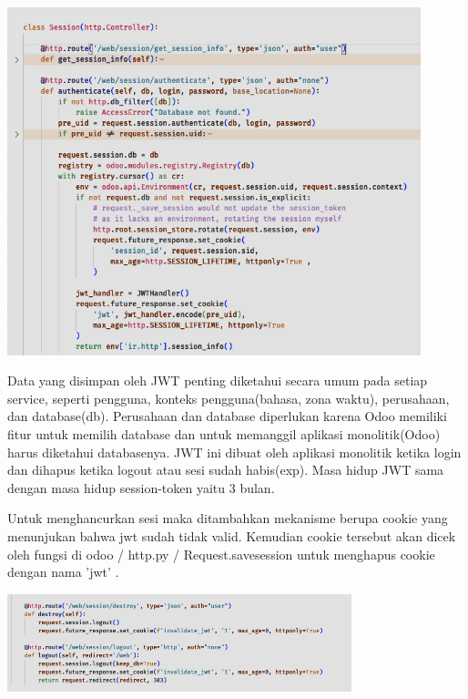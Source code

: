 \begin{center}
	\includegraphics[width=12cm]{img/bab_4/sessionRoute.png}
	\label{fig:sessionRoute}
\end{center}

Data yang disimpan oleh JWT penting diketahui secara umum pada setiap service, seperti pengguna, konteks pengguna(bahasa, zona waktu), perusahaan, dan database(db).  Perusahaan dan database diperlukan karena Odoo memiliki fitur untuk memilih database dan untuk memanggil  aplikasi monolitik(Odoo) harus diketahui databasenya. JWT ini dibuat oleh aplikasi monolitik ketika login dan dihapus ketika logout atau sesi sudah habis(exp). Masa hidup JWT sama dengan masa hidup session-token yaitu 3 bulan.

Untuk menghancurkan sesi maka  ditambahkan mekanisme berupa cookie yang menunjukan bahwa jwt sudah tidak valid. Kemudian cookie tersebut akan dicek oleh fungsi di odoo / http.py / Request.savesession untuk menghapus cookie dengan nama 'jwt' . 

\begin{center}
	\includegraphics[width=10cm]{img/bab_4/triggerCookieDel.png}
	\label{fig:triggerCookieDel}
\end{center}

